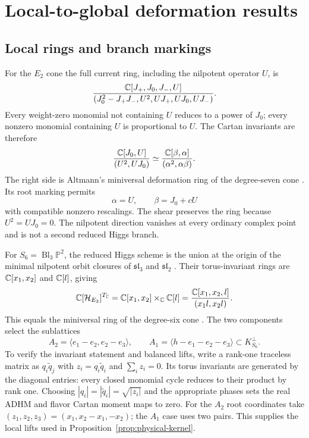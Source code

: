 \section{Local-to-global deformation results}
\label{app:deformations}\label{sec:global-theorems}

\subsection{Local rings and branch markings}

For the $E_2$ cone the full current ring, including the nilpotent
operator $U$, is \cite{Cremonesi:2015lsa}
\begin{equation}
 \frac{\mathbb C[J_+,J_0,J_-,U]}
 {(J_0^2-J_+J_-,U^2,UJ_+,UJ_0,UJ_-)}.
 \label{eq:e2-full-ring}
\end{equation}
Every weight-zero monomial not containing $U$ reduces to a power
of $J_0$; every nonzero monomial containing $U$ is proportional
to $U$. The Cartan invariants are therefore
\begin{equation}
 \frac{\mathbb C[J_0,U]}{(U^2,UJ_0)}
 \simeq\frac{\mathbb C[\beta,\alpha]}{(\alpha^2,\alpha\beta)}.
 \label{eq:e2-altmann}
\end{equation}
The right side is Altmann's miniversal deformation ring of the
degree-seven cone \cite{Altmann:1997}. Its root marking permits
\begin{equation}
 \alpha=U,\qquad\beta=J_0+cU
 \label{eq:e2-dictionary}
\end{equation}
with compatible nonzero rescalings. The shear preserves the ring
because $U^2=UJ_0=0$. The nilpotent direction vanishes at every
ordinary complex point and is not a second reduced Higgs branch.

For $S_6=\operatorname{Bl}_3\mathbb P^2$, the reduced Higgs
scheme is the union at the origin of the minimal nilpotent orbit
closures of $\mathfrak{sl}_3$ and $\mathfrak{sl}_2$
\cite{Cremonesi:2015lsa}. Their torus-invariant rings are
$\mathbb C[x_1,x_2]$ and $\mathbb C[l]$, giving
\begin{equation}
 \mathbb C[\mathcal H_{E_3}]^{T_\mathbb C}
 =\mathbb C[x_1,x_2]\times_\mathbb C\mathbb C[l]
 =\frac{\mathbb C[x_1,x_2,l]}{(x_1l,x_2l)}.
 \label{eq:e3-invariants}
\end{equation}
This equals the miniversal ring of the degree-six cone
\cite{Altmann:1997}. The two components select the sublattices
\begin{equation}
 A_2=\langle e_1-e_2,e_2-e_3\rangle,\qquad
 A_1=\langle h-e_1-e_2-e_3\rangle
 \subset K_{S_6}^\perp.
 \label{eq:e3-roots}
\end{equation}
To verify the invariant statement and balanced lifts, write a
rank-one traceless matrix as $q_i\widetilde q_j$ with
$z_i=q_i\widetilde q_i$ and $\sum_i z_i=0$. Its torus
invariants are generated by the diagonal entries: every closed
monomial cycle reduces to their product by rank one. Choosing
$|q_i|=|\widetilde q_i|=\sqrt{|z_i|}$ and the appropriate phases
sets the real ADHM and flavor Cartan moment maps to zero.
For the $A_2$ root coordinates take
$(z_1,z_2,z_3)=(x_1,x_2-x_1,-x_2)$; the $A_1$ case uses
two pairs. This supplies the local lifts used in
Proposition~\ref{prop:physical-kernel}.

